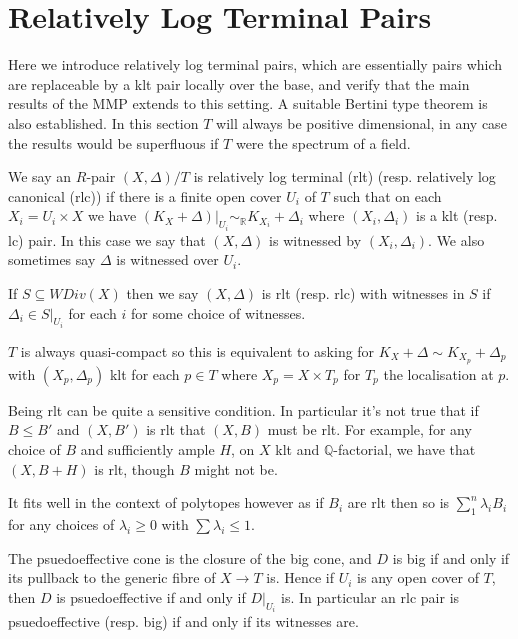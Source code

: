 	
	
	\section{Relatively Log Terminal Pairs} \label{rlt-section}


	Here we introduce relatively log terminal pairs, which are essentially pairs which are replaceable by a klt pair locally over the base, and verify that the main results of the MMP extends to this setting. A suitable Bertini type theorem is also established. In this section $T$ will always be positive dimensional, in any case the results would be superfluous if $T$ were the spectrum of a field.
	
	\begin{definition}
		We say an $R$-pair $(X,\Delta)/T$ is relatively log terminal (rlt) (resp. relatively log canonical (rlc)) if there is a finite open cover $U_{i}$ of $T$ such that on each $X_{i}=U_{i} \times X$ we have $(K_{X}+\Delta)|_{U_{i}} \sim_{\mathbb{R}} K_{X_{i}}+\Delta_{i}$ where $(X_{i},\Delta_{i})$ is a klt (resp. lc) pair. In this case we say that $(X,\Delta)$ is witnessed by $(X_{i},\Delta_{i})$. We also sometimes say $\Delta$ is witnessed over $U_{i}$. 
		
		If $S \subseteq WDiv(X)$ then we say $(X,\Delta)$ is rlt (resp. rlc) with witnesses in $S$ if $\Delta_{i} \in S|_{U_{i}}$ for each $i$ for some choice of witnesses.
	\end{definition}
	\begin{remark}
		$T$ is always quasi-compact so this is equivalent to asking for $K_{X}+\Delta \sim K_{X_{p}}+\Delta_{p}$ with $(X_{p},\Delta_{p})$ klt for each $p \in T$ where $X_{p}=X \times T_{p}$ for $T_{p}$ the localisation at $p$.
	\end{remark}
	
	Being rlt can be quite a sensitive condition. In particular it's not true that if $B \leq B'$ and $(X,B')$ is rlt that $(X,B)$ must be rlt. For example, for any choice of $B$ and sufficiently ample $H$, on $X$ klt and $\mathbb{Q}$-factorial, we have that $(X,B+H)$ is rlt, though $B$ might not be.
	
	It fits well in the context of polytopes however as if $B_{i}$ are rlt then so is $\sum_{1}^{n} \lambda_{i}B_{i}$ for any choices of $\lambda_{i} \geq 0$ with $\sum \lambda_{i} \leq 1$.
	
	The psuedoeffective cone is the closure of the big cone, and $D$ is big if and only if its pullback to the generic fibre of $X \to T$ is. Hence if $U_{i}$ is any open cover of $T$, then $D$ is psuedoeffective if and only if $D|_{U_{i}}$ is. In particular an rlc pair is psuedoeffective (resp. big) if and only if its witnesses are.
	
